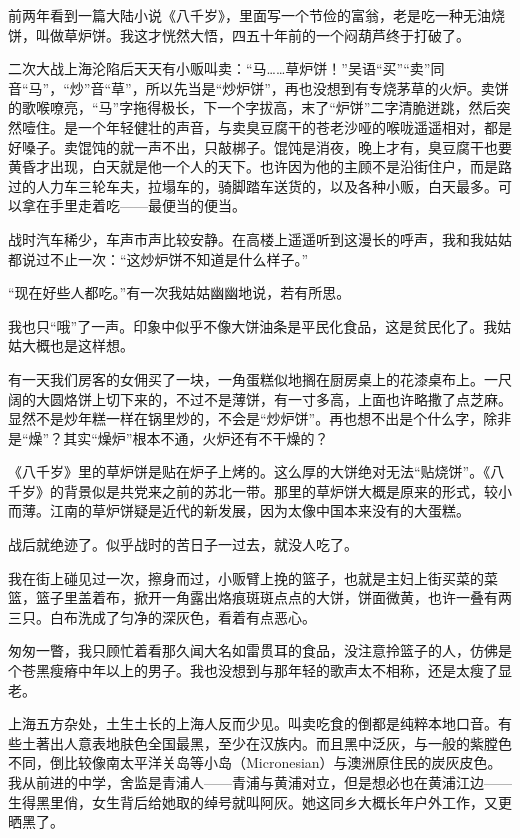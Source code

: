 \par 前两年看到一篇大陆小说《八千岁》，里面写一个节俭的富翁，老是吃一种无油烧饼，叫做草炉饼。我这才恍然大悟，四五十年前的一个闷葫芦终于打破了。
\par 二次大战上海沦陷后天天有小贩叫卖：“马……草炉饼！”吴语“买”“卖”同音“马”，“炒”音“草”，所以先当是“炒炉饼”，再也没想到有专烧茅草的火炉。卖饼的歌喉嘹亮，“马”字拖得极长，下一个字拔高，末了“炉饼”二字清脆迸跳，然后突然噎住。是一个年轻健壮的声音，与卖臭豆腐干的苍老沙哑的喉咙遥遥相对，都是好嗓子。卖馄饨的就一声不出，只敲梆子。馄饨是消夜，晚上才有，臭豆腐干也要黄昏才出现，白天就是他一个人的天下。也许因为他的主顾不是沿街住户，而是路过的人力车三轮车夫，拉塌车的，骑脚踏车送货的，以及各种小贩，白天最多。可以拿在手里走着吃——最便当的便当。
\par 战时汽车稀少，车声市声比较安静。在高楼上遥遥听到这漫长的呼声，我和我姑姑都说过不止一次：“这炒炉饼不知道是什么样子。”
\par “现在好些人都吃。”有一次我姑姑幽幽地说，若有所思。
\par 我也只“哦”了一声。印象中似乎不像大饼油条是平民化食品，这是贫民化了。我姑姑大概也是这样想。
\par 有一天我们房客的女佣买了一块，一角蛋糕似地搁在厨房桌上的花漆桌布上。一尺阔的大圆烙饼上切下来的，不过不是薄饼，有一寸多高，上面也许略撒了点芝麻。显然不是炒年糕一样在锅里炒的，不会是“炒炉饼”。再也想不出是个什么字，除非是“燥”？其实“燥炉”根本不通，火炉还有不干燥的？
\par 《八千岁》里的草炉饼是贴在炉子上烤的。这么厚的大饼绝对无法“贴烧饼”。《八千岁》的背景似是共党来之前的苏北一带。那里的草炉饼大概是原来的形式，较小而薄。江南的草炉饼疑是近代的新发展，因为太像中国本来没有的大蛋糕。
\par 战后就绝迹了。似乎战时的苦日子一过去，就没人吃了。
\par 我在街上碰见过一次，擦身而过，小贩臂上挽的篮子，也就是主妇上街买菜的菜篮，篮子里盖着布，掀开一角露出烙痕斑斑点点的大饼，饼面微黄，也许一叠有两三只。白布洗成了匀净的深灰色，看着有点恶心。
\par 匆匆一瞥，我只顾忙着看那久闻大名如雷贯耳的食品，没注意拎篮子的人，仿佛是个苍黑瘦瘠中年以上的男子。我也没想到与那年轻的歌声太不相称，还是太瘦了显老。
\par 上海五方杂处，土生土长的上海人反而少见。叫卖吃食的倒都是纯粹本地口音。有些土著出人意表地肤色全国最黑，至少在汉族内。而且黑中泛灰，与一般的紫膛色不同，倒比较像南太平洋关岛等小岛（Micronesian）与澳洲原住民的炭灰皮色。我从前进的中学，舍监是青浦人——青浦与黄浦对立，但是想必也在黄浦江边——生得黑里俏，女生背后给她取的绰号就叫阿灰。她这同乡大概长年户外工作，又更晒黑了。
